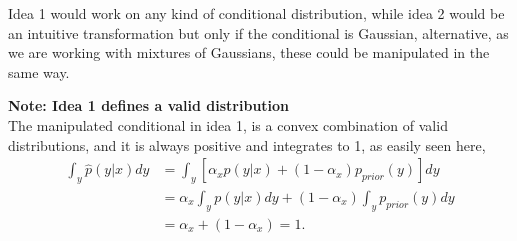Idea 1 would work on any kind of conditional distribution, while idea 2 would be an intuitive transformation
but only if the conditional is Gaussian, alternative, as we are working with mixtures 
of Gaussians, these could be manipulated in the same way. 

\begin{tcolorbox}[
    sharp corners,
    boxrule=0mm,
    enhanced,
    borderline west={4pt}{0pt}{gray},
    colframe=drGray,
    colback=drGray,
    coltitle=black,
]
{\large \textbf{Note: Idea 1 defines a valid distribution}}\\
    The manipulated conditional in idea 1, is a convex combination of valid distributions, 
    and it is always positive and integrates to 1, as easily seen here, 
    \begin{align*}
        \int_y \hat p(y|x) dy &= \int_y \left[ \alpha_x p(y|x) + (1-\alpha_x)p_{prior}(y) \right] dy\\
        &= \alpha_x \int_y p(y|x)dy +(1-\alpha_x) \int_y p_{prior}(y)dy \\
        &= \alpha_x + (1-\alpha_x) = 1.
    \end{align*}
\end{tcolorbox}



